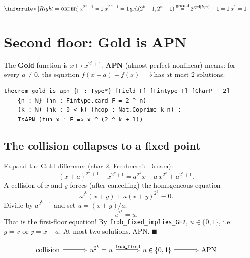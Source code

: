 \documentclass[11pt]{article}
\begin{document}

\[
\inferrule*[Right=\textsc{order}]
{
  \;x^{2^k-1}=1\;
  \\
  \;x^{2^n-1}=1\;
  \\
  \gcd(2^k-1,2^n-1)\overset{\text{ground}}{=}2^{\gcd(k,n)}-1=1
}
{\; x^{1}=1 \;}
\]

\bigskip

\section{Second floor: Gold is APN}

\noindent
The \textbf{Gold} function is $x\mapsto x^{2^k+1}$. \textbf{APN} (almost perfect
nonlinear) means: for every $a\neq 0$, the equation
$f(x+a)+f(x)=b$ has at most $2$ solutions.

\begin{lstlisting}
theorem gold_is_apn {F : Type*} [Field F] [Fintype F] [CharP F 2]
    {n : ℕ} (hn : Fintype.card F = 2 ^ n)
    (k : ℕ) (hk : 0 < k) (hcop : Nat.Coprime k n) :
    IsAPN (fun x : F => x ^ (2 ^ k + 1))
\end{lstlisting}

\bigskip
\subsection*{The collision collapses to a fixed point}

\noindent
Expand the Gold difference (char $2$, Freshman's Dream):
\[
(x+a)^{2^k+1}+x^{2^k+1}
= a^{2^k}x + a\,x^{2^k} + a^{2^k+1}.
\]
A collision of $x$ and $y$ forces (after cancelling) the homogeneous equation
\[
a^{2^k}(x+y) + a(x+y)^{2^k}=0 .
\]
Divide by $a^{2^k+1}$ and set $u=(x+y)/a$:
\[
u^{2^k}=u .
\]
That is the first-floor equation! By \texttt{frob\_fixed\_implies\_GF2},
$u\in\{0,1\}$, i.e. $y=x$ or $y=x+a$. At most two solutions. APN. \hfill$\blacksquare$


\[
\begin{tikzcd}[row sep=small, column sep=large]
\text{collision} \arrow[r, Rightarrow] & u^{2^k}=u \arrow[r, Rightarrow, "{\texttt{frob\_fixed}}"] & u\in\{0,1\} \arrow[r, Rightarrow] & \text{APN}
\end{tikzcd}
\]
\end{document}
